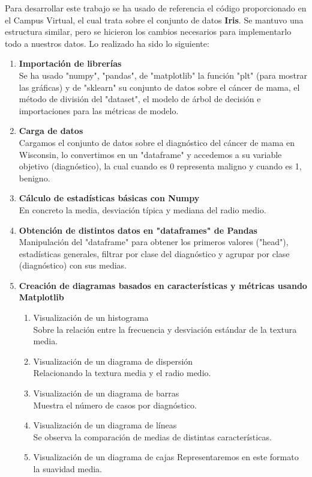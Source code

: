 \documentclass{llncs}
\begin{document}
{Para desarrollar este trabajo se ha usado de referencia el código proporcionado en el Campus Virtual, el cual trata sobre el conjunto de datos \textbf{Iris}. Se mantuvo una estructura similar, pero se hicieron los cambios necesarios para implementarlo todo a nuestros datos. Lo realizado ha sido lo siguiente:
\begin{enumerate}
  \item \textbf{Importación de librerías} \\
    Se ha usado "numpy", "pandas", de "matplotlib" la función "plt" (para mostrar las gráficas) y de "sklearn" su conjunto de datos sobre el cáncer de mama, el método de división del "dataset", el modelo de árbol de decisión e importaciones para las métricas de modelo.\\
  
  \item \textbf{Carga de datos}\\
    Cargamos el conjunto de datos sobre el diagnóstico del cáncer de mama en Wisconsin, lo convertimos en un "dataframe" y accedemos a su variable objetivo (diagnóstico), la cual cuando es 0 representa maligno y cuando es 1, benigno. \\
  
  \item \textbf{Cálculo de estadísticas básicas con Numpy}\\
    En concreto la media, desviación típica y mediana del radio medio.\\
  
  \item \textbf{Obtención de distintos datos en "dataframes" de Pandas}\\
    Manipulación del "dataframe" para obtener los primeros valores ("head"), estadísticas generales, filtrar por clase del diagnóstico y agrupar por clase (diagnóstico) con sus medias.\\
  
  \item \textbf{Creación de diagramas basados en características y métricas usando Matplotlib}
    \begin{enumerate}
        \item Visualización de un histograma\\
            Sobre la relación entre la frecuencia y desviación estándar de la textura media.
        \item Visualización de un diagrama de dispersión\\
            Relacionando la textura media y el radio medio.
        \item Visualización de un diagrama de barras\\
            Muestra el número de casos por diagnóstico.
        \item Visualización de un diagrama de líneas\\
            Se observa la comparación de medias de distintas características.
        \item Visualización de un diagrama de cajas
            Representaremos en este formato la suavidad media.\\
    \end{enumerate}
  

\end{enumerate}}
\end{document}

